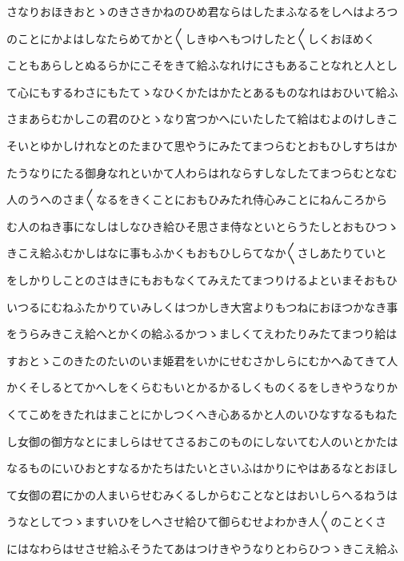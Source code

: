 \documentclass[a4paper,11pt,landscape]{ltjtarticle}
\begin{document}
\par\medskip
さなりおほきおとゝのきさきかねのひめ君ならはしたまふなるをしへはよろつ
\par\medskip
のことにかよはしなたらめてかと〱しきゆへもつけしたと〱しくおほめく
\par\medskip
こともあらしとぬるらかにこそをきて給ふなれけにさもあることなれと人とし
\par\medskip
て心にもするわさにもたてゝなひくかたはかたとあるものなれはおひいて給ふ
\par\medskip
さまあらむかしこの君のひとゝなり宮つかへにいたしたて給はむよのけしきこ
\par\medskip
そいとゆかしけれなとのたまひて思やうにみたてまつらむとおもひしすちはか
\par\medskip
たうなりにたる御身なれといかて人わらはれならすしなしたてまつらむとなむ
\par\medskip
人のうへのさま〱なるをきくことにおもひみたれ侍心みことにねんころから
\par\medskip
む人のねき事になしはしなひき給ひそ思さま侍なといとらうたしとおもひつゝ
\par\medskip
きこえ給ふむかしはなに事もふかくもおもひしらてなか〱さしあたりていと
\par\medskip
をしかりしことのさはきにもおもなくてみえたてまつりけるよといまそおもひ
\par\medskip
いつるにむねふたかりていみしくはつかしき大宮よりもつねにおほつかなき事
\par\medskip
をうらみきこえ給へとかくの給ふるかつゝましくてえわたりみたてまつり給は
\par\medskip
すおとゝこのきたのたいのいま姫君をいかにせむさかしらにむかへゐてきて人
\par\medskip
かくそしるとてかへしをくらむもいとかるかるしくものくるをしきやうなりか
\par\medskip
くてこめをきたれはまことにかしつくへき心あるかと人のいひなすなるもねた
\par\medskip
し女御の御方なとにましらはせてさるおこのものにしないてむ人のいとかたは
\par\medskip
なるものにいひおとすなるかたちはたいとさいふはかりにやはあるなとおほし
\par\medskip
て女御の君にかの人まいらせむみくるしからむことなとはおいしらへるねうは
\par\medskip
うなとしてつゝますいひをしへさせ給ひて御らむせよわかき人〱のことくさ
\par\medskip
にはなわらはせさせ給ふそうたてあはつけきやうなりとわらひつゝきこえ給ふ
\par\medskip
\end{document}
